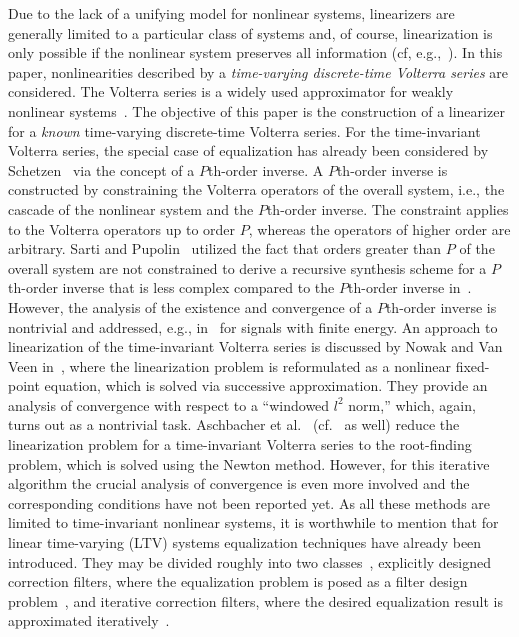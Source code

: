 \documentclass[10pt,twocolumn,twoside]{IEEEtran}
\begin{document}
Due to the lack of a unifying model for nonlinear systems, linearizers
are generally limited to a particular class of systems and, of course, linearization
is only possible if the nonlinear system preserves all information
(cf, e.g.,~\cite{geiger2011}). In this paper, nonlinearities
described by a \emph{time-varying discrete-time Volterra series} are considered. The
Volterra series is a widely used approximator for weakly nonlinear
systems~\cite{schetzen1980,rugh1981,mathews2000}. The objective of this paper is
the construction of a linearizer for a \emph{known} time-varying
discrete-time Volterra series. 
For the time-invariant Volterra series, the special case of equalization has already been
considered by Schetzen~\cite{schetzen1976} via the concept of a $P$th-order inverse.
A $P$th-order inverse is constructed by constraining the Volterra operators of the
overall system, i.e., the cascade of the nonlinear system and the $P$th-order inverse. The
constraint applies to the Volterra operators up to order $P$, whereas the operators
of higher order are arbitrary. Sarti and Pupolin~\cite{sarti1992} utilized
the fact that orders greater than $P$ of the overall system are not constrained
to derive a recursive synthesis scheme for a $P$th-order inverse that is less
complex compared to the $P$th-order inverse in~\cite{schetzen1976}. However,
the analysis of the existence and convergence of a $P$th-order inverse is
nontrivial and addressed, e.g., in~\cite{fang2001} for signals with finite energy.
An approach to linearization of the time-invariant Volterra series
is discussed by Nowak and Van Veen in~\cite{nowak1997}, where the
linearization problem is reformulated as a nonlinear fixed-point equation, which
is solved via successive approximation. They provide
an analysis of convergence with respect to a ``windowed $l^2$ norm,'' which, again,
turns out as a nontrivial task. Aschbacher et al.~\cite{aschbacher2004} (cf.~\cite{redfern1998} as well)
reduce the linearization problem for a time-invariant Volterra series to
the root-finding problem, which is solved using the Newton method. However,
for this iterative algorithm the crucial analysis of convergence is even more
involved and the corresponding conditions have not been reported yet.
As all these methods are limited to time-invariant nonlinear systems, it is worthwhile
to mention that for linear time-varying (LTV) systems equalization techniques have already
been introduced. They may be divided roughly into two classes~\cite{vogel2012},
explicitly designed correction filters, where the equalization problem is posed as a
filter design problem~\cite{johansson2006,johansson2008}, and iterative correction filters,
where the desired equalization result is approximated iteratively~\cite{vogel2009,
tsui2011b,soudan2012}.
\end{document}
